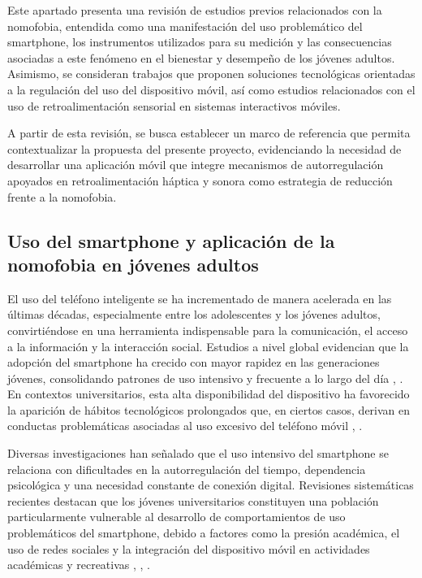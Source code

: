 Este apartado presenta una revisión de estudios previos relacionados con la nomofobia, entendida como una manifestación del uso problemático del smartphone, los instrumentos utilizados para su medición y las consecuencias asociadas a este fenómeno en el bienestar y desempeño de los jóvenes adultos. Asimismo, se consideran trabajos que proponen soluciones tecnológicas orientadas a la regulación del uso del dispositivo móvil, así como estudios relacionados con el uso de retroalimentación sensorial en sistemas interactivos móviles.

A partir de esta revisión, se busca establecer un marco de referencia que permita contextualizar la propuesta del presente proyecto, evidenciando la necesidad de desarrollar una aplicación móvil que integre mecanismos de autorregulación apoyados en retroalimentación háptica y sonora como estrategia de reducción frente a la nomofobia.

\subsection{Uso del smartphone y aplicación de la nomofobia en jóvenes adultos}

El uso del teléfono inteligente se ha incrementado de manera acelerada en las últimas décadas, especialmente entre los adolescentes y los jóvenes adultos, convirtiéndose en una herramienta indispensable para la comunicación, el acceso a la información y la interacción social. Estudios a nivel global evidencian que la adopción del smartphone ha crecido con mayor rapidez en las generaciones jóvenes, consolidando patrones de uso intensivo y frecuente a lo largo del día \cite{Silver2019}, \cite{ijerph17020580}. En contextos universitarios, esta alta disponibilidad del dispositivo ha favorecido la aparición de hábitos tecnológicos prolongados que, en ciertos casos, derivan en conductas problemáticas asociadas al uso excesivo del teléfono móvil \cite{MontagWalla2016}, \cite{Ali31122024}.

Diversas investigaciones han señalado que el uso intensivo del smartphone se relaciona con dificultades en la autorregulación del tiempo, dependencia psicológica y una necesidad constante de conexión digital. Revisiones sistemáticas recientes destacan que los jóvenes universitarios constituyen una población particularmente vulnerable al desarrollo de comportamientos de uso problemáticos del smartphone, debido a factores como la presión académica, el uso de redes sociales y la integración del dispositivo móvil en actividades académicas y recreativas \cite{MontagWalla2016}, \cite{EXELMANS201693}, \cite{healthcare11142066}.

